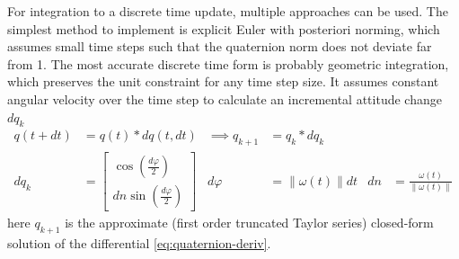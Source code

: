 For integration to a discrete time update, multiple approaches can be used. 
The simplest method to implement is explicit Euler with posteriori norming, which assumes small time steps such that the quaternion norm does not deviate far from 1.
The most accurate discrete time form is probably geometric integration, which preserves the unit constraint for any time step size. It assumes constant angular velocity over the time step to calculate an incremental attitude change $dq_k$ \cite{sola2017} 
\begin{align}
    q(t + dt) &= q(t) * dq(t,dt) 
    &\implies
    q_{k+1} &= q_k * dq_k \\
    dq_k &= \begin{bmatrix} \cos(\frac{d\varphi}{2}) \\ dn \sin(\frac{d\varphi}{2})
    \end{bmatrix}
    & d\varphi &= \lVert \omega(t) \rVert dt 
    & dn &= \frac{\omega(t)}{\lVert \omega(t) \rVert}
    \label{eq:quaternion-increment}
\end{align}
here $q_{k+1}$ is the approximate (first order truncated Taylor series) closed-form solution of the differential \autoref{eq:quaternion-deriv}.





